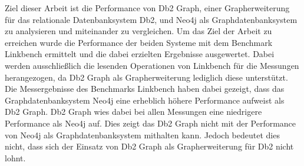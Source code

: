 Ziel dieser Arbeit ist die Performance von Db2 Graph, einer Grapherweiterung für das relationale Datenbanksystem Db2, und Neo4j als Graphdatenbanksystem zu analysieren und miteinander zu vergleichen. Um das Ziel der Arbeit zu erreichen wurde die Performance der beiden Systeme mit dem Benchmark Linkbench ermittelt und die dabei erzielten Ergebnisse ausgewertet. Dabei werden ausschließlich die lesenden Operationen von Linkbench für die Messungen herangezogen, da Db2 Graph als Grapherweiterung lediglich diese unterstützt. Die Messergebnisse des Benchmarks Linkbench haben dabei gezeigt, dass das Graphdatenbanksystem Neo4j eine erheblich höhere Performance aufweist als Db2 Graph. Db2 Graph wies dabei bei allen Messungen eine niedrigere Performance als Neo4j auf. Dies zeigt das Db2 Graph nicht mit der Performance von Neo4j als Graphdatenbanksystem mithalten kann. Jedoch bedeutet dies nicht, dass sich der Einsatz von Db2 Graph als Grapherweiterung für Db2 nicht lohnt.